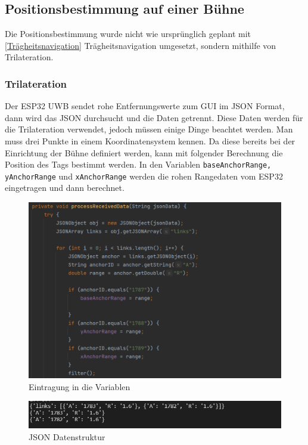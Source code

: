 \subsection{Positionsbestimmung auf einer Bühne}
Die Positionsbestimmung wurde nicht wie ursprünglich geplant mit \ref{Trägheitsnavigation} Trägheitsnavigation umgesetzt, sondern mithilfe von Trilateration. 

\subsubsection{Trilateration}
\label{Trilateration}

Der ESP32 UWB sendet rohe Entfernungswerte zum GUI im JSON Format, dann wird das JSON durchsucht und die Daten getrennt. Diese Daten werden für die Trilateration verwendet, jedoch müssen einige Dinge beachtet werden. Man muss drei Punkte in einem Koordinatensystem kennen. Da diese bereits bei der Einrichtung der Bühne definiert werden, kann mit folgender Berechnung die Position des Tags bestimmt werden. In den Variablen \texttt{baseAnchorRange, yAnchorRange} und \texttt{xAnchorRange} werden die rohen Rangedaten vom ESP32 eingetragen und dann berechnet.

\begin{figure}[H]
	\centering
	\includegraphics[width=0.9\linewidth]{images/EintragungVariablen.png}
	\caption[EintragungVariablen]{Eintragung in die Variablen}
	\label{fig:Variableneintragung}
\end{figure}

\begin{figure}[H]
	\centering
	\includegraphics[width=0.9\linewidth]{images/JSONData.png}
	\caption[JSONData]{JSON Datenstruktur}
	\label{fig:JSONData}
\end{figure}

